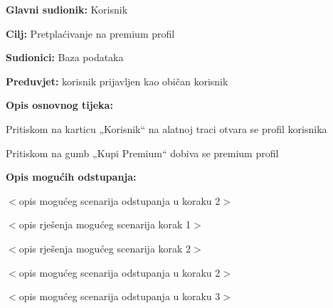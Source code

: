 					\noindent {}
				\begin{packed_item}
					
					\item \textbf{Glavni sudionik: }Korisnik
					\item  \textbf{Cilj:} Pretplaćivanje na premium profil
					\item  \textbf{Sudionici:}
					Baza podataka
					\item  \textbf{Preduvjet:} korisnik prijavljen kao običan korisnik
					\item  \textbf{Opis osnovnog tijeka:}
					
					\item[] \begin{packed_enum}
						
						\item	Pritiskom na karticu „Korisnik“ na alatnoj traci otvara se profil korisnika
						\item Pritiskom na gumb  „Kupi Premium“  dobiva se premium profil
						
					\end{packed_enum}
					
					\item  \textbf{Opis mogućih odstupanja:}
					
					\item[] \begin{packed_item}
						
						\item[2.a] $<$opis mogućeg scenarija odstupanja u koraku 2$>$
						\item[] \begin{packed_enum}
							
							\item $<$opis rješenja mogućeg scenarija korak 1$>$
							\item $<$opis rješenja mogućeg scenarija korak 2$>$
							
						\end{packed_enum}
						\item[2.b] $<$opis mogućeg scenarija odstupanja u koraku 2$>$
						\item[3.a] $<$opis mogućeg scenarija odstupanja  u koraku 3$>$
						
					\end{packed_item}
				\end{packed_item}
			

